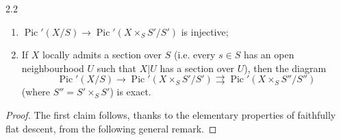 \begin{proposition}{2.2}
    
 \begin{enumerate}
      
 \item[i.]
        \(\operatorname {Pic}'(X/S)\to \operatorname {Pic}'(X\times _S S'/S')\) is injective;
      

      
 \item[ii.]
        If \(X\) locally admits a section over \(S\) (i.e. every \(s\in  S\) has an open neighbourhood \(U\) such that \(X|U\) has a section over \(U\)), then the diagram
        \[           \operatorname {Pic}'(X/S)           \to  \operatorname {Pic}'(X\times _S S'/S')           \rightrightarrows  \operatorname {Pic}'(X\times _S S''/S'')         \]
        (where \(S''=S'\times _S S'\)) is exact.
      

    \end{enumerate}\begin{proof}\par{}The first claim follows, thanks to the elementary properties of faithfully flat descent, from the following general remark.
      

\end{proof}
\end{proposition}
